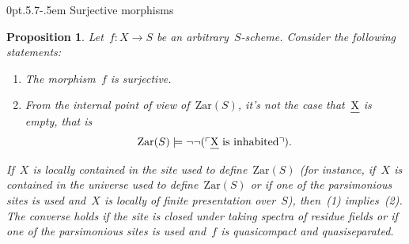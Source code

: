 \documentclass[10pt,reqno,a4paper]{amsbook}
\makeatletter
\theoremstyle{definition}
\theoremstyle{plain}
\newtheorem{prop}[defn]{Proposition}
\theoremstyle{remark}
\let\oldul\ul
\renewcommand{\ul}[1]{\text{\oldul{$#1$}}}
\newcommand{\Zar}{\mathrm{Zar}}
\newcommand{\?}{\,{:}\,}
\renewcommand{\_}{\mathpunct{.}\,}
\newcommand{\speak}[1]{\ulcorner\text{\textnormal{#1}}\urcorner}
\def\subsection{\@startsection{subsection}{2}%
  {0pt}{.5\linespacing\@plus.7\linespacing}{-.5em}%
  {\normalfont\bfseries}}
\makeatother
\begin{document}
\subsection{Surjective morphisms}

\begin{prop}\label{prop:char-surjective-morphisms}
Let~$f : X \to S$ be an arbitrary~$S$-scheme. Consider the following
statements:
\begin{enumerate}
\item The morphism~$f$ is surjective.
\item From the internal point of view of~$\Zar(S)$, it's not the case that~$\ul{X}$ is
empty, that is
\[ \Zar(S) \models \neg\neg(\speak{$\ul{X}$ is inhabited}). \]
\end{enumerate}
If~$X$ is locally contained in the site used to define~$\Zar(S)$ (for instance,
if~$X$ is contained in the universe used to define~$\Zar(S)$ or if one of the
parsimonious sites is used and~$X$ is locally of finite presentation over~$S$),
then~(1) implies~(2). The converse holds if the site is closed under
taking spectra of residue fields or if one of the parsimonious sites is used
and~$f$ is quasicompact and quasiseparated.
\end{prop}
\end{document}
